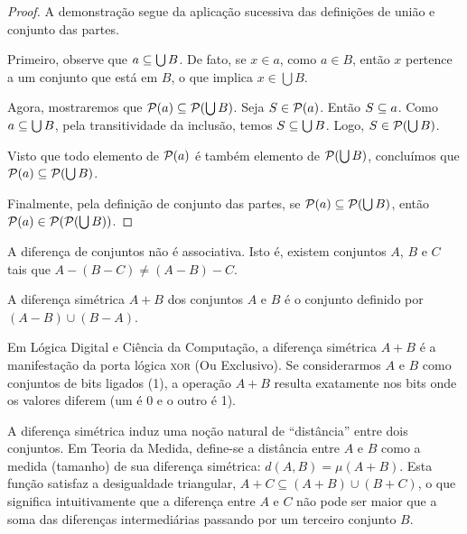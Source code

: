 \begin{proof}
    A demonstração segue da aplicação sucessiva das definições de união e conjunto das partes.

    Primeiro, observe que \(a \subseteq \bigcup B\). De fato, se \(x \in a\), como \(a \in B\), então \(x\) pertence a um conjunto que está em \(B\), o que implica \(x \in \bigcup B\).

    Agora, mostraremos que \(\mathcal{P}(a) \subseteq \mathcal{P}(\bigcup B)\). Seja \(S \in \mathcal{P}(a)\). Então \(S \subseteq a\). Como \(a \subseteq \bigcup B\), pela transitividade da inclusão, temos \(S \subseteq \bigcup B\). Logo, \(S \in \mathcal{P}(\bigcup B)\).

    Visto que todo elemento de \(\mathcal{P}(a)\) é também elemento de \(\mathcal{P}(\bigcup B)\), concluímos que \(\mathcal{P}(a) \subseteq \mathcal{P}(\bigcup B)\).

    Finalmente, pela definição de conjunto das partes, se \(\mathcal{P}(a) \subseteq \mathcal{P}(\bigcup B)\), então \(\mathcal{P}(a) \in \mathcal{P}(\mathcal{P}(\bigcup B))\).
\end{proof}

\begin{proposicao}
    \label{prop:diferenca_nao_associativa}
    A diferença de conjuntos não é associativa. Isto é, existem conjuntos \(A\), \(B\) e \(C\) tais que \(A - (B - C) \neq (A - B) - C\).
\end{proposicao}

\begin{definicao}
    \label{def:diferenca_simetrica}
    A diferença simétrica \(A + B\) dos conjuntos \(A\) e \(B\) é o conjunto definido por \((A - B) \cup (B - A)\).
\end{definicao}



\begin{exemplo}[Ou Exclusivo]
    Em Lógica Digital e Ciência da Computação, a diferença simétrica \(A + B\) é a manifestação da porta lógica \textsc{xor} (Ou Exclusivo). Se considerarmos \(A\) e \(B\) como conjuntos de bits ligados (1), a operação \(A + B\) resulta exatamente nos bits onde os valores diferem (um é 0 e o outro é 1).

    
\end{exemplo}

\begin{exemplo}
    A diferença simétrica induz uma noção natural de ``distância''  entre dois conjuntos. Em Teoria da Medida, define-se a distância entre \(A\) e \(B\) como a medida (tamanho) de sua diferença simétrica: \(d(A,B) = \mu(A + B)\). Esta função satisfaz a desigualdade triangular, \(A + C \subseteq (A + B) \cup (B + C)\), o que significa intuitivamente que a diferença entre \(A\) e \(C\) não pode ser maior que a soma das diferenças intermediárias passando por um terceiro conjunto \(B\).
\end{exemplo}

